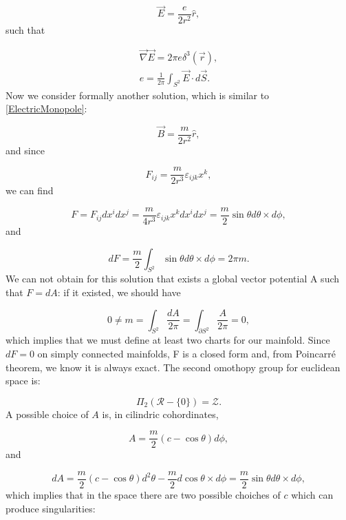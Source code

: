 \documentclass[main.tex]{subfiles}
\begin{document}
\begin{equation}\label{ElectricMonopole}
\vec E=\frac{e}{2r^2}\hat{r},
\end{equation}
such that

\begin{align}
\vec \nabla \vec E=2\pi e \delta^3(\vec r),\\
e=\frac{1}{2\pi}\int_{S^2}\vec E \cdot d\vec S.
\end{align}
Now we consider formally another solution, which is similar to \eqref{ElectricMonopole}:

\begin{equation}\label{MagneticMonopole}
\vec B=\frac{m}{2r^2}\hat{r},
\end{equation}
and since

\begin{equation}
F_{ij}=\frac{m}{2r^3}\varepsilon_{ijk}x^k,
\end{equation}
we can find

\begin{equation}
F=F_{ij}dx^idx^j=\frac{m}{4r^3}\varepsilon_{ijk}x^kdx^idx^j=\frac{m}{2}\sin\theta d\theta\times d\phi,
\end{equation}
and

\begin{equation}
dF=\frac{m}{2}\int_{S^2}\sin\theta d\theta\times d\phi=2\pi m.
\end{equation}
We can not obtain for this solution that exists a global vector potential A such that $F=dA$: if it existed, we should have

\begin{equation}
0\neq m=\int_{S^2}\frac{dA}{2\pi}=\int_{\partial S^2}\frac{A}{2\pi}=0,
\end{equation}
which implies that we must define at least two charts for our mainfold.
Since $dF=0$ on simply connected mainfolds, F is a closed form and, from Poincarré theorem, we know it is always exact. The second omothopy group for euclidean space is:

\begin{equation}
\Pi_2\left(\mathcal{R}-\bigl\{0\bigr\}\right)=\mathcal{Z}.
\end{equation}
A possible choice of $A$ is, in cilindric cohordinates,

\begin{equation}
A=\frac{m}{2}\left(c-\cos\theta\right)d\phi,
\end{equation}
and

\begin{equation}
dA=\frac{m}{2}\left(c-\cos\theta\right)d^2\theta-\frac{m}{2}d\cos\theta\times d \phi=\frac{m}{2}\sin\theta d\theta\times d \phi,
\end{equation}
which implies that in the space there are two possible choiches of $c$ which can produce singularities:
\end{document}
